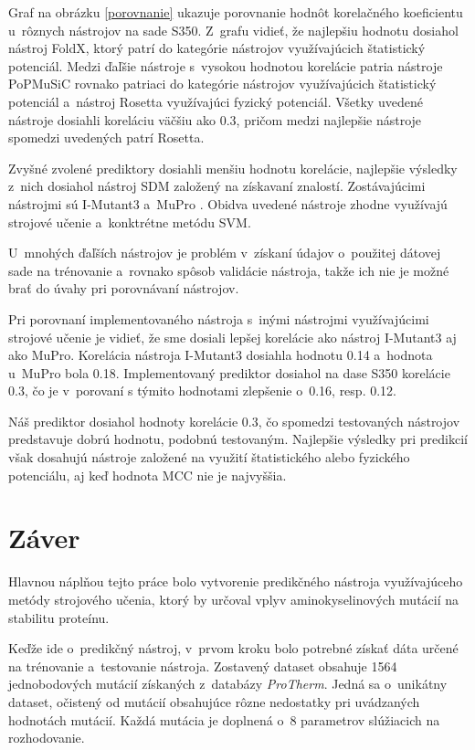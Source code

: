 Graf na obrázku \ref{porovnanie} ukazuje porovnanie hodnôt korelačného koeficientu u~rôznych nástrojov na sade S350. Z~grafu vidieť, že najlepšiu hodnotu dosiahol nástroj FoldX, ktorý patrí do kategórie nástrojov využívajúcich štatistický potenciál. Medzi ďaľšie nástroje s~vysokou hodnotou korelácie patria nástroje PoPMuSiC rovnako patriaci do kategórie nástrojov využívajúcich štatistický potenciál a~nástroj Rosetta využívajúci fyzický potenciál. Všetky uvedené nástroje dosiahli koreláciu väčšiu ako 0.3, pričom medzi najlepšie nástroje spomedzi uvedených patrí Rosetta.

Zvyšné zvolené prediktory dosiahli menšiu hodnotu korelácie, najlepšie výsledky z~nich dosiahol nástroj SDM \cite{sdm} založený na získavaní znalostí. Zostávajúcimi nástrojmi sú I-Mutant3 a~MuPro \cite{mupro} . Obidva uvedené nástroje zhodne využívajú strojové učenie a~konktrétne metódu SVM.
 
U~mnohých ďaľších nástrojov je problém v~získaní údajov o~použitej dátovej sade na trénovanie a~rovnako spôsob validácie nástroja, takže ich nie je možné brať do úvahy pri porovnávaní nástrojov.

Pri porovnaní implementovaného nástroja s~inými nástrojmi využívajúcimi strojové učenie je vidieť, že sme dosiali lepšej korelácie ako nástroj I-Mutant3 aj ako MuPro. Korelácia nástroja I-Mutant3 dosiahla hodnotu 0.14 a~hodnota u~MuPro bola 0.18. Implementovaný prediktor dosiahol na dase S350 korelácie 0.3, čo je v~porovaní s týmito hodnotami zlepšenie o~0.16, resp. 0.12.

Náš prediktor dosiahol hodnoty korelácie 0.3, čo spomedzi testovaných nástrojov predstavuje dobrú hodnotu, podobnú testovaným. Najlepšie výsledky pri predikcií však dosahujú nástroje založené na využití štatistického alebo fyzického potenciálu, aj keď hodnota MCC nie je najvyššia.

\chapter{Záver}

Hlavnou náplňou tejto práce bolo vytvorenie predikčného nástroja využívajúceho metódy strojového učenia, ktorý by určoval vplyv aminokyselinových mutácií na stabilitu proteínu.

Keďže ide o~predikčný nástroj, v~prvom kroku bolo potrebné získať dáta určené na trénovanie a~testovanie nástroja. Zostavený dataset obsahuje 1564 jednobodových mutácií získaných z~databázy \textit{ProTherm}. Jedná sa o~unikátny dataset, očistený od mutácií obsahujúce rôzne nedostatky pri uvádzaných hodnotách mutácií. Každá mutácia je doplnená o~8 parametrov slúžiacich na rozhodovanie.

